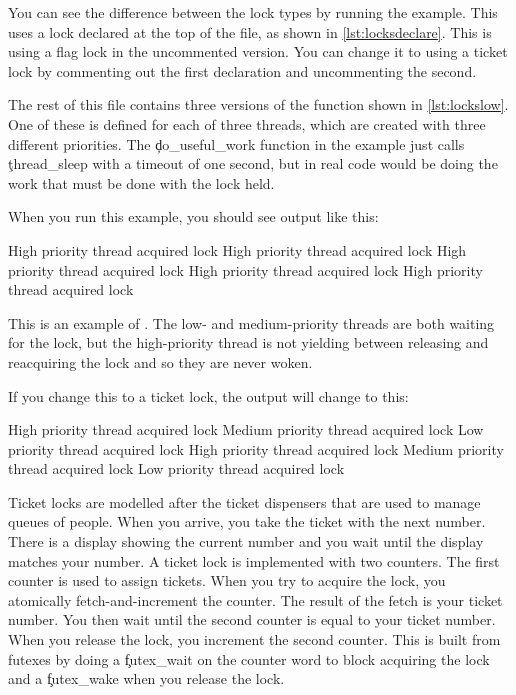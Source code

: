 You can see the difference between the lock types by running the  example.
This uses a lock declared at the top of the file, as shown in \ref{lst:locksdeclare}.
This is using a flag lock in the uncommented version. You can change it to using a ticket lock by commenting out the first declaration and uncommenting the second.

\codelisting[filename=examples/locking/locking.cc,marker=declare,label=lst:locksdeclare,caption="Declaring a lock in C++"]{}

The rest of this file contains three versions of the function shown in \ref{lst:lockslow}.
One of these is defined for each of three threads, which are created with three different priorities.
The \c{do_useful_work} function in the example just calls \c{thread_sleep} with a timeout of one second, but in real code would be doing the work that must be done with the lock held.

\codelisting[filename=examples/locking/locking.cc,marker=low,label=lst:lockslow,caption="The low-priority thread entry point for the locking example"]{}

When you run this example, you should see output like this:

\begin{console}
High priority thread acquired lock
High priority thread acquired lock
High priority thread acquired lock
High priority thread acquired lock
High priority thread acquired lock
\end{console}

This is an example of .
The low- and medium-priority threads are both waiting for the lock, but the high-priority thread is not yielding between releasing and reacquiring the lock and so they are never woken.

If you change this to a ticket lock, the output will change to this:

\begin{console}
High priority thread acquired lock
Medium priority thread acquired lock
Low priority thread acquired lock
High priority thread acquired lock
Medium priority thread acquired lock
Low priority thread acquired lock
\end{console}

Ticket locks are modelled after the ticket dispensers that are used to manage queues of people.
When you arrive, you take the ticket with the next number.
There is a display showing the current number and you wait until the display matches your number.
A ticket lock is implemented with two counters.
The first counter is used to assign tickets.
When you try to acquire the lock, you atomically fetch-and-increment the counter.
The result of the fetch is your ticket number.
You then wait until the second counter is equal to your ticket number.
When you release the lock, you increment the second counter.
This is built from futexes by doing a \c{futex_wait} on the counter word to block acquiring the lock and a \c{futex_wake} when you release the lock.

